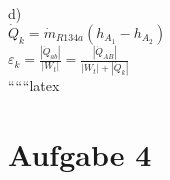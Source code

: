 d) \\
$\dot{Q}_k = \dot{m}_{R134a} (h_{A_1} - h_{A_2})$ \\

$\varepsilon_k = \frac{|\dot{Q}_{ab}|}{|W_t|} = \frac{|\dot{Q}_{AB}|}{|W_t| + |\dot{Q}_k|}$ \\

``````latex


\section*{Aufgabe 4}